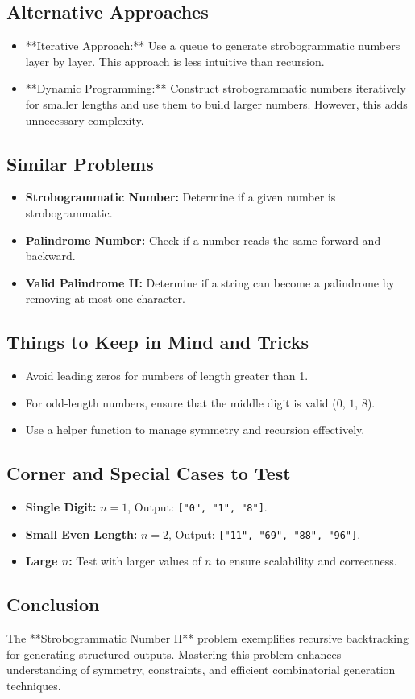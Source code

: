 \subsection*{Alternative Approaches}
\begin{itemize}
    \item **Iterative Approach:** Use a queue to generate strobogrammatic numbers layer by layer. This approach is less intuitive than recursion.
    \item **Dynamic Programming:** Construct strobogrammatic numbers iteratively for smaller lengths and use them to build larger numbers. However, this adds unnecessary complexity.
\end{itemize}

\subsection*{Similar Problems}
\begin{itemize}
    \item \textbf{Strobogrammatic Number:} Determine if a given number is strobogrammatic.
    \item \textbf{Palindrome Number:} Check if a number reads the same forward and backward.
    \item \textbf{Valid Palindrome II:} Determine if a string can become a palindrome by removing at most one character.
\end{itemize}

\subsection*{Things to Keep in Mind and Tricks}
\begin{itemize}
    \item Avoid leading zeros for numbers of length greater than 1.
    \item For odd-length numbers, ensure that the middle digit is valid (\(0\), \(1\), \(8\)).
    \item Use a helper function to manage symmetry and recursion effectively.
\end{itemize}

\subsection*{Corner and Special Cases to Test}
\begin{itemize}
    \item \textbf{Single Digit:} \( n = 1 \), Output: \texttt{["0", "1", "8"]}.
    \item \textbf{Small Even Length:} \( n = 2 \), Output: \texttt{["11", "69", "88", "96"]}.
    \item \textbf{Large \( n \):} Test with larger values of \( n \) to ensure scalability and correctness.
\end{itemize}

\subsection*{Conclusion}
The **Strobogrammatic Number II** problem exemplifies recursive backtracking for generating structured outputs. Mastering this problem enhances understanding of symmetry, constraints, and efficient combinatorial generation techniques.
